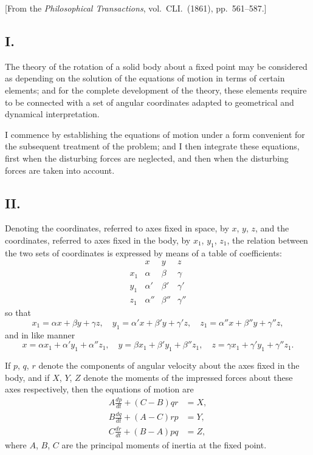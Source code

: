 \documentclass[11pt,a4paper]{book}
\begin{document}
{{\begin{center}
[From the \textit{Philosophical Transactions}, vol.\ CLI.\ (1861), pp.~561--587.]
\end{center}

\subsection*{I.}

The theory of the rotation of a solid body about a fixed point may be considered as depending on the solution of the equations of motion in terms of certain elements; and for the complete development of the theory, these elements require to be connected with a set of angular coordinates adapted to geometrical and dynamical interpretation.

I commence by establishing the equations of motion under a form convenient for the subsequent treatment of the problem; and I then integrate these equations, first when the disturbing forces are neglected, and then when the disturbing forces are taken into account.

\subsection*{II.}

Denoting the coordinates, referred to axes fixed in space, by $x$, $y$, $z$, and the coordinates, referred to axes fixed in the body, by $x_1$, $y_1$, $z_1$, the relation between the two sets of coordinates is expressed by means of a table of coefficients:
\[
\begin{array}{c|ccc}
 & x & y & z \\
\hline
x_1 & \alpha & \beta & \gamma \\
y_1 & \alpha' & \beta' & \gamma' \\
z_1 & \alpha'' & \beta'' & \gamma''
\end{array}
\]
so that
\[
x_1 = \alpha x + \beta y + \gamma z, \quad
y_1 = \alpha' x + \beta' y + \gamma' z, \quad
z_1 = \alpha'' x + \beta'' y + \gamma'' z,
\]
and in like manner
\[
x = \alpha x_1 + \alpha' y_1 + \alpha'' z_1, \quad
y = \beta x_1 + \beta' y_1 + \beta'' z_1, \quad
z = \gamma x_1 + \gamma' y_1 + \gamma'' z_1.
\]

If $p$, $q$, $r$ denote the components of angular velocity about the axes fixed in the body, and if $X$, $Y$, $Z$ denote the moments of the impressed forces about these axes respectively, then the equations of motion are
\begin{align*}
A\frac{dp}{dt} + (C-B)qr &= X, \\
B\frac{dq}{dt} + (A-C)rp &= Y, \\
C\frac{dr}{dt} + (B-A)pq &= Z,
\end{align*}
where $A$, $B$, $C$ are the principal moments of inertia at the fixed point.

}}
\end{document}
